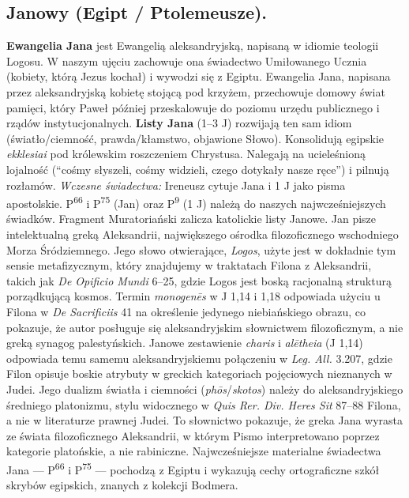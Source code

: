 \subsection{Janowy (Egipt / Ptolemeusze).}

\textbf{Ewangelia Jana} jest Ewangelią aleksandryjską, napisaną w idiomie teologii Logosu.
W naszym ujęciu zachowuje ona świadectwo Umiłowanego Ucznia (kobiety, którą Jezus kochał) i wywodzi się z Egiptu.
Ewangelia Jana, napisana przez aleksandryjską kobietę stojącą pod krzyżem, przechowuje domowy świat pamięci, który Paweł później przeskalowuje do poziomu urzędu publicznego i rządów instytucjonalnych.
\textbf{Listy Jana} (1–3 J) rozwijają ten sam idiom (światło/ciemność, prawda/kłamstwo, objawione Słowo).
Konsolidują egipskie \textit{ekklesiai} pod królewskim roszczeniem Chrystusa.
Nalegają na ucieleśnioną lojalność (``cośmy słyszeli, cośmy widzieli, czego dotykały nasze ręce'') i pilnują rozłamów.
\emph{Wczesne świadectwa:} Ireneusz cytuje Jana i 1 J jako pisma apostolskie.
P\textsuperscript{66} i P\textsuperscript{75} (Jan) oraz P\textsuperscript{9} (1 J) należą do naszych najwcześniejszych świadków.
Fragment Muratoriański zalicza katolickie listy Janowe.
Jan pisze intelektualną greką Aleksandrii, największego ośrodka filozoficznego wschodniego Morza Śródziemnego.
Jego słowo otwierające, \textit{Logos}, użyte jest w dokładnie tym sensie metafizycznym, który znajdujemy w traktatach Filona z Aleksandrii, takich jak \textit{De Opificio Mundi} 6–25, gdzie Logos jest boską racjonalną strukturą porządkującą kosmos.
Termin \textit{monogenēs} w J 1,14 i 1,18 odpowiada użyciu u Filona w \textit{De Sacrificiis} 41 na określenie jedynego niebiańskiego obrazu, co pokazuje, że autor posługuje się aleksandryjskim słownictwem filozoficznym, a nie greką synagog palestyńskich.
Janowe zestawienie \textit{charis} i \textit{alētheia} (J 1,14) odpowiada temu samemu aleksandryjskiemu połączeniu w \textit{Leg. All.} 3.207, gdzie Filon opisuje boskie atrybuty w greckich kategoriach pojęciowych nieznanych w Judei.
Jego dualizm światła i ciemności (\textit{phōs}/\textit{skotos}) należy do aleksandryjskiego średniego platonizmu, stylu widocznego w \textit{Quis Rer. Div. Heres Sit} 87–88 Filona, a nie w literaturze prawnej Judei.
To słownictwo pokazuje, że greka Jana wyrasta ze świata filozoficznego Aleksandrii, w którym Pismo interpretowano poprzez kategorie platońskie, a nie rabiniczne.
Najwcześniejsze materialne świadectwa Jana — P\textsuperscript{66} i P\textsuperscript{75} — pochodzą z Egiptu i wykazują cechy ortograficzne szkół skrybów egipskich, znanych z kolekcji Bodmera.
